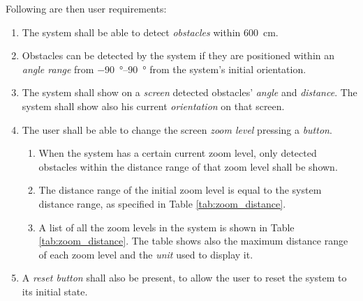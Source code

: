 Following are then user requirements:

\begin{enumerate}

    \item The system shall be able to detect {\em obstacles} within \SI{600}{\centi\metre}.
    
    \item Obstacles can be detected by the system if they are positioned within an {\em angle range} from \SIrange[retain-explicit-plus]{-90}{+90}{\degree} from the system's initial orientation.
    
    \item The system shall show on a {\em screen} detected obstacles' {\em angle} and {\em distance}. The system shall show also his current {\em orientation} on that screen.
    
    \item The user shall be able to change the screen {\em zoom level} pressing a {\em button}.
    
    \begin{enumerate}
        \item \label{marker-shown-obst} When the system has a certain current zoom level, only detected obstacles within the distance range of that zoom level shall be shown.
        
        \item The distance range of the initial zoom level is equal to the system distance range, as specified in Table \ref{tab:zoom_distance}.
        
        \item A list of all the zoom levels in the system is shown in Table \ref{tab:zoom_distance}. The table shows also the maximum distance range of each zoom level and the {\em unit} used to display it.
    \end{enumerate}
    
    \item A {\em reset button} shall also be present, to allow the user to reset the system to its initial state.
\end{enumerate}
    